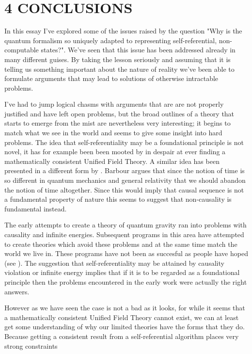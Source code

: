 \documentclass[
   ,final            %
  ]
  {aipproc}
\begin{document}
\section{4 CONCLUSIONS}
\par
In this essay I've explored some of the issues raised by the question "Why is the quantum formalism so uniquely adapted to representing %
self-referential, non-computable states?". We've seen that this issue has been addressed already in many different guises. By taking the lesson %
seriously and assuming that it is telling us something important about the nature of reality we've been able to formulate arguments that may lead to %
solutions of otherwise intractable problems. 
\par
I've had to jump logical chasms with arguments that are are not properly justified and have left open problems, but the broad outlines of a theory %
that starts to emerge from the mist are nevertheless very interesting; it begins to match what we see in the world and seems to give some insight into %
hard problems. The idea that
self-referentiality may be a foundational principle is not novel, it has for example been been mooted by \citet{hawkin_2003}
in despair at ever finding a mathematically consistent Unified Field Theory. A similar idea has been presented in  a different form by
\citet{Barbour_EOT}. Barbour argues that since the notion of time is so different in quantum mechanics and
general relativity that we should abandon the notion of time altogether. Since this would imply that causal
sequence is not a fundamental property of nature this seems to suggest that non-causality is fundamental
instead. 
\par
The early attempts to create a theory of quantum gravity ran into problems with causality and infinite energies. Subsequent programs in this area have %
attempted to create theories which avoid these problems and at the same time match the world we live in. These programs have not been as succesful as %
people have hoped (see \citet{smolin_03}). The suggestion that self-referentiality may be attained by causality violation or infinite energy implies %
that if it is to be regarded as a foundational principle then the problems encountered in the early work were actually the right answers.   
\par
However as we have seen the case is not a bad as it looks, for while it seems that a mathematically consistent
Unified Field Theory cannot exist, we can at least get some understanding of why
our limited theories have the forms that they do. Because getting a consistent result from a self-referential algorithm places very strong constraints %
\end{document}

